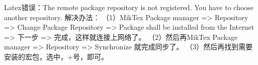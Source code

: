 \documentclass{article}
\begin{document}
  Latex错误：The remote package repository is not registered. You have to choose another repository. 
  解决办法： 
  （1）MikTex Package manager => Repository => Change Package Repository => Package shall be installed from the Internet => 下一步 => 完成，这样就连接上网络了。 
  （2）然后再MikTex Package manager => Repository => Synchronize 就完成同步了。 
  （3）然后再找到需要安装的宏包，选中，+号，即可。 



   
  




  \begin{appendix}
    \listoffigures
    \listoftables
  \end{appendix}
\end{document}
